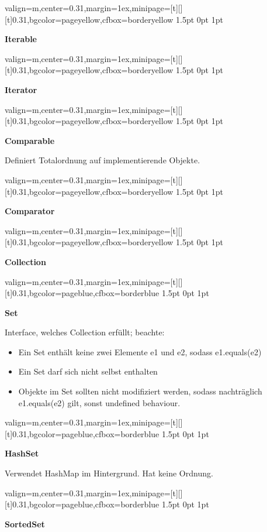 \documentclass[11pt, a4paper, landscape]{article}
\newcommand{\fancyheader}[1]{
	\centerline{\sffamily \textbf{ \large #1}}
}
\newenvironment{fancybox}[2]
{
	\begin{adjustbox}{valign=m,center=0.31\textwidth,margin=1ex,minipage=[t][][t]{0.31\textwidth},bgcolor=#1,cfbox=#2 1.5pt 0pt 1pt}
	\begin{centering}
}
{
	\end{centering}
	\end{adjustbox}
}
\begin{document}

\begin{multicols}{3}
\raggedcolumns

\begin{fancybox}{pageyellow}{borderyellow}
\fancyheader{Iterable}

\end{fancybox}

\begin{fancybox}{pageyellow}{borderyellow}
\fancyheader{Iterator}

\end{fancybox}

\begin{fancybox}{pageyellow}{borderyellow}
\fancyheader{Comparable}
\raggedright{
Definiert Totalordnung auf implementierende Objekte.
}

\end{fancybox}

\begin{fancybox}{pageyellow}{borderyellow}
\fancyheader{Comparator}

\end{fancybox}

\begin{fancybox}{pageyellow}{borderyellow}
\fancyheader{Collection}

\end{fancybox}

\begin{fancybox}{pageblue}{borderblue}
\fancyheader{Set}


Interface, welches Collection erfüllt; beachte:
\begin{itemize}
\item Ein Set enthält keine zwei Elemente e1 und e2, sodass e1.equals(e2)
\item Ein Set darf sich nicht selbst enthalten
\item Objekte im Set sollten nicht modifiziert werden, sodass nachträglich e1.equals(e2) gilt, sonst undefined behaviour.
\end{itemize}
\end{fancybox}

\begin{fancybox}{pageblue}{borderblue}
\fancyheader{HashSet}

\raggedright{
	Verwendet HashMap im Hintergrund. Hat keine Ordnung.
}
\end{fancybox}

\begin{fancybox}{pageblue}{borderblue}
\fancyheader{SortedSet}



\end{fancybox}
\end{multicols}
\end{document}
